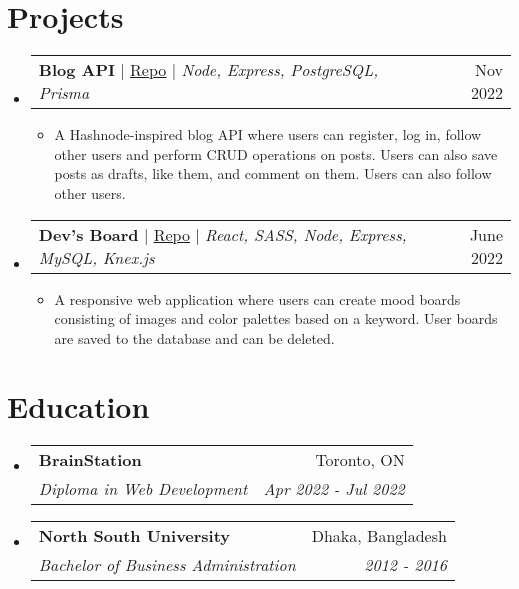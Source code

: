 \documentclass[letterpaper,11pt]{article}
\makeatletter
\newcommand{\resumeItem}[1]{
  \item\small{
    {#1 \vspace{-2pt}}
  }
}
\newcommand{\resumeSubheading}[4]{
  \vspace{-2pt}\item
    \begin{tabular*}{0.97\textwidth}[t]{l@{\extracolsep{\fill}}r}
      \textbf{#1} & #2 \\
      \textit{\small#3} & \textit{\small #4} \\
    \end{tabular*}\vspace{-7pt}
}
\newcommand{\resumeProjectHeading}[2]{
    \item
    \begin{tabular*}{0.97\textwidth}{l@{\extracolsep{\fill}}r}
      \small#1 & #2 \\
    \end{tabular*}\vspace{-7pt}
}
\newcommand{\resumeSubHeadingListStart}{\begin{itemize}[leftmargin=0.15in, label={}]}
\newcommand{\resumeSubHeadingListEnd}{\end{itemize}}
\newcommand{\resumeItemListStart}{\begin{itemize}}
\newcommand{\resumeItemListEnd}{\end{itemize}\vspace{-5pt}}
\makeatother
\begin{document}
\section{Projects}
    \resumeSubHeadingListStart
      \resumeProjectHeading
          {\textbf{Blog API} $|$ \href{https://github.com/LamiSaadat/devs-board-client}{\underline{Repo}} $|$ \emph{Node, Express, PostgreSQL, Prisma}}{Nov 2022}
          \resumeItemListStart
            \resumeItem{A Hashnode-inspired blog API where users can register, log in, follow other users and perform CRUD operations on posts. Users can also save posts as drafts, like them, and comment on them. Users can also follow other users.}
          \resumeItemListEnd
      \resumeProjectHeading
          {\textbf{Dev's Board} $|$ \href{https://github.com/LamiSaadat/blog-api}{\underline{Repo}} $|$ \emph{React, SASS, Node, Express, MySQL, Knex.js}}{June 2022}
          \resumeItemListStart
            \resumeItem{A responsive web application where users can create mood boards consisting of images and color palettes based on a keyword. User boards are saved to the database and can be deleted.}
          \resumeItemListEnd
    \resumeSubHeadingListEnd



%

\section{Education}
  \resumeSubHeadingListStart
    \resumeSubheading
      {BrainStation}{Toronto, ON}
      {Diploma in Web Development}{Apr 2022 - Jul 2022}
    \resumeSubheading
      {North South University}{Dhaka, Bangladesh}
      {Bachelor of Business Administration}{2012 - 2016}
  \resumeSubHeadingListEnd


\end{document}
